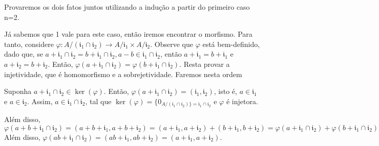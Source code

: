 \documentclass[algebraII_notes.tex]{subfiles}
\begin{document}
\begin{proof*}
	Provaremos os dois fatos juntos utilizando a indução a partir do primeiro caso n=2.

	Já sabemos que 1 vale para este caso, então iremos encontrar o morfismo. Para tanto, considere \(\varphi :A/(\mathfrak{i}_{1}\cap \mathfrak{i}_{2})\rightarrow A/\mathfrak{i}_{1}\times A/\mathfrak{i}_{2}.\)
	Observe que \(\varphi \) está bem-definido, dado que, se \(a+\mathfrak{i}_{1}\cap \mathfrak{i}_{2} = b + \mathfrak{i}_{1}\cap \mathfrak{i}_{2}, a-b\in \mathfrak{i}_{1}\cap \mathfrak{i}_2\),
	então \(a+\mathfrak{i}_{1} = b + \mathfrak{i}_{1}\) e \(a + \mathfrak{i}_{2} = b + \mathfrak{i}_{2}.\) Então, \(\varphi(a+\mathfrak{i}_{1}\cap \mathfrak{i}_{2}) = \varphi(b+\mathfrak{i}_{1}\cap \mathfrak{i}_{2}).\)
	Resta provar a injetividade, que é homomorfismo e a sobrejetividade. Faremos nesta ordem

	Suponha \(a+\mathfrak{i}_{1}\cap \mathfrak{i}_{2}\in\ker{(\varphi )}\). Então, \(\varphi (a + \mathfrak{i}_{1}\cap \mathfrak{i}_{2}) = (\mathfrak{i}_{1}, \mathfrak{i}_{2})\),
	isto é, \(a\in \mathfrak{i}_{1}\) e \(a\in \mathfrak{i}_{2}.\) Assim, \(a\in \mathfrak{i}_{1}\cap \mathfrak{i}_{2}\), tal que \(\ker{(\varphi )} = \{0_{A/(\mathfrak{i}_{1}\cap \mathfrak{i}_{2})\} = \mathfrak{i}_{1}\cap \mathfrak{i}_{2}}\)
	e \(\varphi \) é injetora.

	Além disso, \(\varphi (a + b + \mathfrak{i}_{1}\cap \mathfrak{i}_{2}) = (a+b+\mathfrak{i}_{1}, a + b + \mathfrak{i}_{2}) =
	(a + \mathfrak{i}_{1}, a + \mathfrak{i}_{2}) + (b+\mathfrak{i}_{1}, b + \mathfrak{i}_{2}) = \varphi(a + \mathfrak{i}_{1}\cap \mathfrak{i}_{2}) + \varphi(b + \mathfrak{i}_{1}\cap \mathfrak{i}_{2}).\)
	Além disso, \(\varphi (ab + \mathfrak{i}_{1}\cap \mathfrak{i}_{2}) = (ab + \mathfrak{i}_{1}, ab+ \mathfrak{i}_{2}) = (a+\mathfrak{i}_{1}, a+\mathfrak{i}_{2}).\)


\end{proof*}
\end{document}
